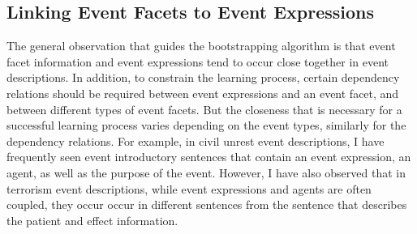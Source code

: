 \subsection{Linking Event Facets to Event Expressions}

The general observation that guides the bootstrapping algorithm 
is that event facet information and event expressions 
tend to occur close together in event descriptions. 
In addition, to constrain the learning process, 
certain dependency relations should be 
required between event expressions and an event facet, 
and between different types of event facets. 
But the closeness that is necessary for a successful learning process 
varies depending on the event types, similarly for 
the dependency relations.
For example, in civil unrest event descriptions, 
I have frequently seen event introductory sentences that 
contain an event expression, an agent, as well as the purpose of the event. 
However, I have also observed that in terrorism event descriptions, 
while event expressions and agents are often coupled, they occur 
occur in different sentences from the sentence that 
describes the patient and effect information. 




